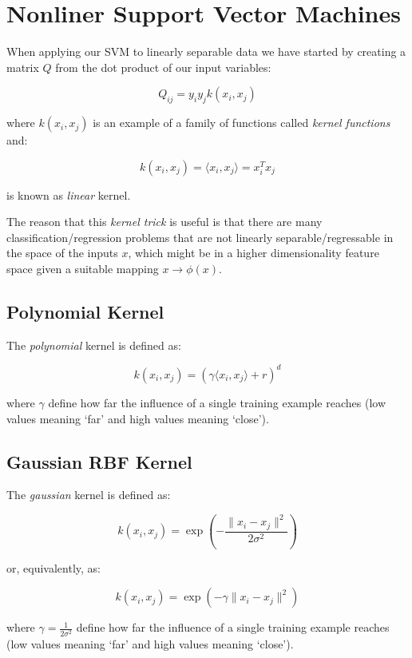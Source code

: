 \section{Nonliner Support Vector Machines}

When applying our SVM to linearly separable data we have started by creating a matrix $Q$ from the dot product of our input variables:

\begin{equation}
	Q_{ij}=y_i y_j k(x_i,x_j) \tag{3.1}
\end{equation}

where $k(x_i,x_j)$ is an example of a family of functions called \emph{kernel functions} and:  

\begin{equation}
	k(x_i,x_j)=\langle x_i, x_j \rangle= x_i^T x_j \tag{3.2}
\end{equation}

is known as \emph{linear} kernel.

The reason that this \emph{kernel trick} is useful is that there are many classification/regression problems that are not linearly separable/regressable in the space of the inputs $x$, which might be in a higher dimensionality feature space given a suitable mapping $x \rightarrow \phi(x)$.

\subsection{Polynomial Kernel}

The \emph{polynomial} kernel is defined as:

\begin{equation}
	k(x_i,x_j)=(\gamma \langle x_i, x_j\rangle + r)^d \tag{3.3}
\end{equation}

where $\gamma$ define how far the influence of a single training example reaches (low values meaning ‘far’ and high values meaning ‘close’).

\subsection{Gaussian RBF Kernel}

The \emph{gaussian} kernel is defined as:

\begin{equation}
	k(x_i,x_j)=\exp(-\frac{\|x_i-x_j\|^2}{2\sigma^2}) \tag{3.4a}
\end{equation}

or, equivalently, as:

\begin{equation}
	k(x_i,x_j)=\exp(-\gamma \|x_i-x_j\|^2) \tag{3.4b}
\end{equation}

where $\displaystyle \gamma=\frac{1}{2\sigma^2}$ define how far the influence of a single training example reaches (low values meaning ‘far’ and high values meaning ‘close’).